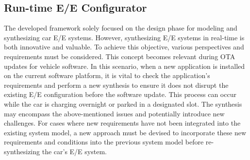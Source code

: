     
          
    
    \subsection{Run-time E/E Configurator}
    
    
    The developed framework solely focused on the design phase for modeling and synthesizing car E/E systems. However, synthesizing E/E systems in real-time is both innovative and valuable. To achieve this objective, various perspectives and requirements must be considered. This concept becomes relevant during OTA updates for vehicle software. In this scenario, when a new application is installed on the current software platform, it is vital to check the application's requirements and perform a new synthesis to ensure it does not disrupt the existing E/E configuration before the software update. This process can occur while the car is charging overnight or parked in a designated slot. The synthesis may encompass the above-mentioned issues and potentially introduce new challenges. For cases where new requirements have not been integrated into the existing system model, a new approach must be devised to incorporate these new requirements and conditions into the previous system model before re-synthesizing the car's E/E system.
    
